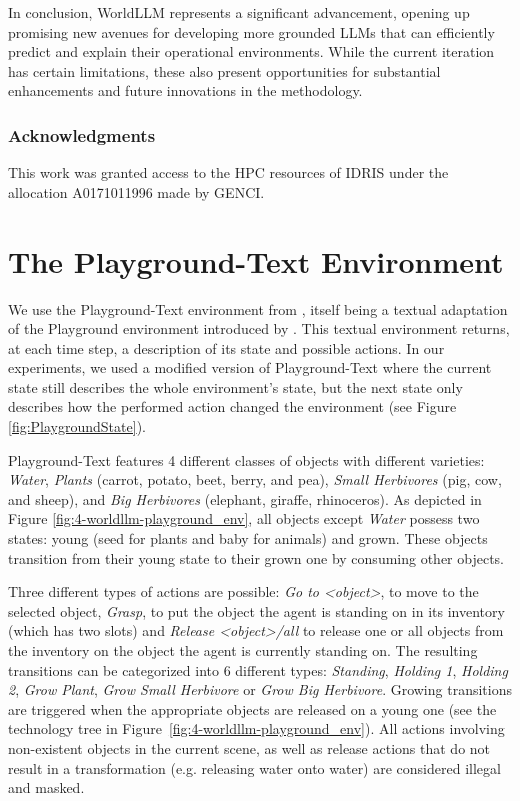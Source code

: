 \documentclass{article}
\begin{document}
In conclusion, WorldLLM represents a significant advancement, opening up promising new avenues for developing more grounded LLMs that can efficiently predict and explain their operational environments. While the current iteration has certain limitations, these also present opportunities for substantial enhancements and future innovations in the methodology.

\subsubsection*{Acknowledgments}
This work was granted access to the HPC resources of IDRIS under the allocation A0171011996 made by GENCI.

\newpage



\newpage
\appendix

\section{The Playground-Text Environment}
\label{app:experimental_setup}
We use the Playground-Text environment from \citep{gaven2024sacglamimprovingonlinerl}, itself being a textual adaptation of the Playground environment introduced by \citep{colas_language_2020}. This textual environment returns, at each time step, a description of its state and possible actions. In our experiments, we used a modified version of Playground-Text where the current state still describes the whole environment's state, but the next state only describes how the performed action changed the environment (see Figure \ref{fig:PlaygroundState}). 

Playground-Text features 4 different classes of objects with different varieties: \textit{Water}, \textit{Plants} (carrot, potato, beet, berry, and pea), \textit{Small Herbivores} (pig, cow, and sheep), and \textit{Big Herbivores} (elephant, giraffe, rhinoceros). As depicted in Figure \ref{fig:4-worldllm-playground_env}, all objects except \textit{Water} possess two states: young (seed for plants and baby for animals) and grown. These objects transition from their young state to their grown one by consuming other objects.

Three different types of actions are possible: \textit{Go to <object>}, to move to the selected object, \textit{Grasp}, to put the object the agent is standing on in its inventory (which has two slots) and \textit{Release <object>/all} to release one or all objects from the inventory on the object the agent is currently standing on. The resulting transitions can be categorized into 6 different types: \textit{Standing}, \textit{Holding 1}, \textit{Holding 2}, \textit{Grow Plant}, \textit{Grow Small Herbivore} or  \textit{Grow Big Herbivore}. Growing transitions are triggered when the appropriate objects are released on a young one (see the technology tree in Figure~\ref{fig:4-worldllm-playground_env}).   
All actions involving non-existent objects in the current scene, as well as release actions that do not result in a transformation (e.g. releasing water onto water) are considered illegal and masked.
\end{document}
